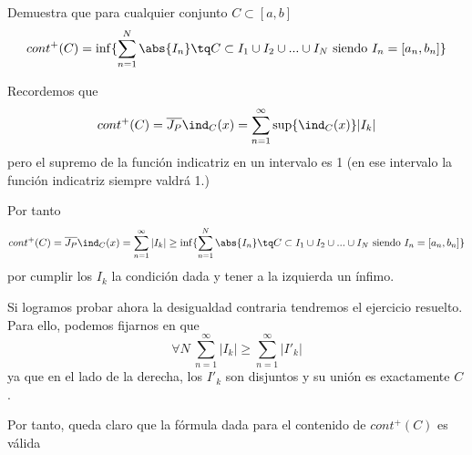 \begin{problem}[8]
Demuestra que para cualquier conjunto $C\subset [a,b]$
\[cont^+(C) = \inf \{\sum_{n=1}^N\abs{I_n} \tq C \subset I_1 \cup I_2 \cup ... \cup I_N \text{ siendo } I_n=[a_n,b_n]\}\]

\solution

Recordemos que
\[cont^+(C)=\overline{J_P}\ind_C(x) = \sum_{n=1}^{\infty}\sup\{\ind_C(x)\}|I_k|\]
pero el supremo de la función indicatriz en un intervalo es 1 (en ese intervalo la función indicatriz siempre valdrá 1.)

Por tanto
\[cont^+(C)=\overline{J_P}\ind_C(x) =  \sum_{n=1}^{\infty}|I_k| \geq \inf \{\sum_{n=1}^N\abs{I_n} \tq C \subset I_1 \cup I_2 \cup ... \cup I_N \text{ siendo } I_n=[a_n,b_n]\}\]
por cumplir los $I_k$ la condición dada y tener a la izquierda un ínfimo.

Si logramos probar ahora la desigualdad contraria tendremos el ejercicio resuelto.
Para ello, podemos fijarnos en que
\[\forall N \  \sum_{n=1}^{\infty}|I_k| \geq \sum_{n=1}^{\infty}|I'_k| \]
ya que en el lado de la derecha, los $I'_k$ son disjuntos y su unión es exactamente $C$.

Por tanto, queda claro que la fórmula dada para el contenido de $cont^+(C)$ es válida

\end{problem}

